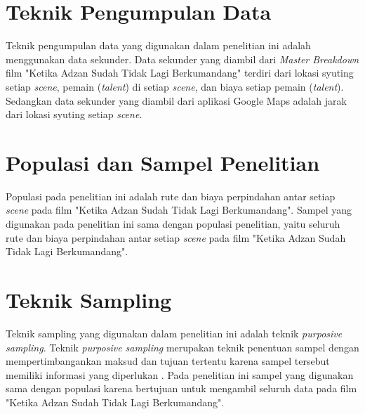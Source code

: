 \section{Teknik Pengumpulan Data}
\vspace{-4mm}
{\frenchspacing
    Teknik pengumpulan data yang digunakan dalam penelitian ini adalah menggunakan data sekunder.
    Data sekunder yang diambil dari \textit{Master Breakdown} film "Ketika Adzan Sudah Tidak Lagi Berkumandang" terdiri dari lokasi syuting setiap \textit{scene}, pemain (\textit{talent}) di setiap \textit{scene},
    dan biaya setiap pemain (\textit{talent}).
    Sedangkan data sekunder yang diambil dari aplikasi Google Maps adalah jarak dari lokasi syuting setiap \textit{scene}.
}
\vspace{-3mm}

\section{Populasi dan Sampel Penelitian}
\vspace{-4mm}
{\frenchspacing
    Populasi pada penelitian ini adalah rute dan biaya perpindahan antar setiap \textit{scene} pada film "Ketika Adzan Sudah Tidak Lagi Berkumandang".
    Sampel yang digunakan pada penelitian ini sama dengan populasi penelitian, yaitu seluruh rute dan biaya perpindahan antar setiap \textit{scene} pada film "Ketika Adzan Sudah Tidak Lagi Berkumandang".
}
\vspace{-3mm}

\section{Teknik Sampling}
\vspace{-4mm}
{\frenchspacing
    Teknik sampling yang digunakan dalam penelitian ini adalah teknik \textit{purposive sampling}.
    Teknik \textit{purposive sampling} merupakan teknik penentuan sampel dengan mempertimbangankan maksud dan tujuan tertentu karena sampel tersebut memiliki informasi yang diperlukan .
    Pada penelitian ini sampel yang digunakan sama dengan populasi karena bertujuan untuk mengambil seluruh data pada film "Ketika Adzan Sudah Tidak Lagi Berkumandang".
}
\vspace{-3mm}

